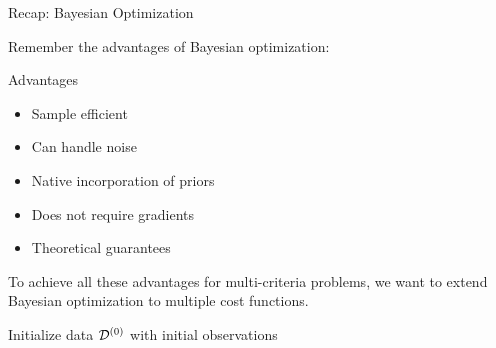 \begin{frame}[allowframebreaks]{Recap: Bayesian Optimization}

Remember the advantages of Bayesian optimization:

\begin{block}{Advantages}
\begin{itemize}
  \item Sample efficient
  \item Can handle noise
  \item Native incorporation of priors
  \item Does not require gradients
  \item Theoretical guarantees
\end{itemize}
\end{block}

To achieve all these advantages for multi-criteria problems, we want to extend Bayesian optimization to multiple cost functions.

\framebreak

\begin{center}
\begin{minipage}{0.75\textwidth}
\begin{algorithm}[H]
    \setcounter{AlgoLine}{0}


	Initialize data $\iter[0]{\dataset}$ with initial observations\;%

    \For{$\bocount=1$ \KwTo $\bobudget$}{
		Fit predictive model $\iter[\bocount]{\surro}$ on $\iter[\bocount-1]{\dataset}$\;

		Select next query point: $\bonextsample \in \argmax_{\conf \in \pcs} \acq(\conf; \iter[\bocount-1]{\dataset}, \iter[\bocount]{\surro})$\;

		Query $\bonextobs$\;

		Update data: $\iter[\bocount]{\dataset} \leftarrow \iter[\bocount-1]{\dataset} \cup \{\langle \bonextsample, \bonextobs \rangle \}$\;
	}
	\caption*{Bayesian optimization loop}
\end{algorithm}
\end{minipage}
\end{center}
\end{frame}


